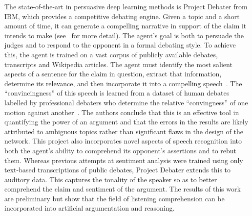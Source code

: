 The state-of-the-art in persuasive deep learning methods is Project Debater from IBM, which provides a competitive debating engine. Given a topic and a short amount of time, it can generate a compelling narrative in support of the claim it intends to make (see~\cite{Hou2017ArgumentModel, Mass2018WordSpeech} for more detail). The agent's goal is both to persuade the judges and to respond to the opponent in a formal debating style. To achieve this, the agent is trained on a vast corpus of publicly available debates, transcripts and Wikipedia articles. The agent must identify the most salient aspects of a sentence for the claim in question, extract that information, determine its relevance, and then incorporate it into a compelling speech~\cite{Levy2018TowardsSupervision}. The ``convincingness'' of this speech is learned from a dataset of human debates labelled by professional debaters who determine the relative ``convingness'' of one motion against another~\cite{Habernal2016WhichLSTM}. The authors conclude that this is an effective tool in quantifying the power of an argument and that the errors in the results are likely attributed to ambiguous topics rather than significant flaws in the design of the network. This project also incorporates novel aspects of speech recognition into both the agent's ability to comprehend its opponent's assertions and to rebut them. Whereas previous attempts at sentiment analysis were trained using only text-based transcriptions of public debates, Project Debater extends this to auditory data. This captures the tonality of the speaker so as to better comprehend the claim and sentiment of the argument. The results of this work are preliminary but show that the field of listening comprehension can be incorporated into artificial argumentation and reasoning.


